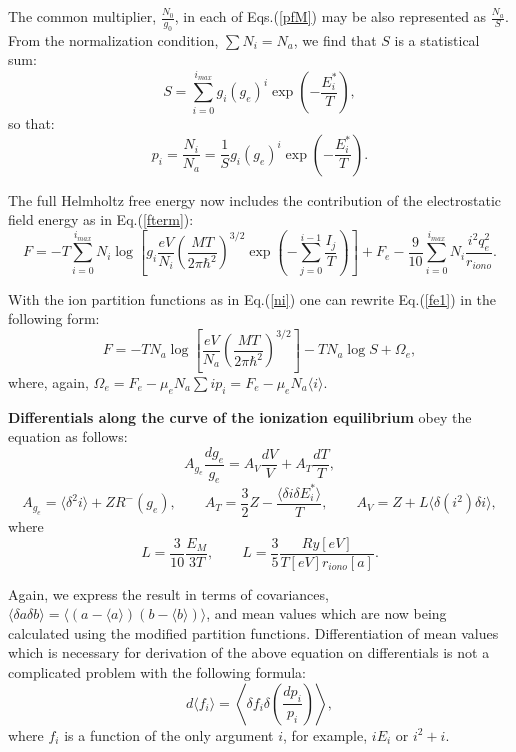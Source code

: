 The common multiplier, $\frac{N_0}{g_0}$, in each of Eqs.(\ref{pfM}) may be also represented as $\frac{N_a}{S}$.
From the normalization condition, $\sum N_i = N_a$, we find that $S$ is a statistical sum:
\begin{equation}
S=\sum_{i=0}^{i_{max}} g_i (g_e)^i \exp\left(-\frac{E_i^*}T\right),
\end{equation}
so that:
\begin{equation}\label{ni}
p_i = \frac{N_i}{N_a} = \frac{1}S g_i (g_e)^i \exp \left( -\frac{E_i^*}T \right).
\end{equation}

The full Helmholtz free energy now includes the contribution of the electrostatic field energy as in Eq.(\ref{fterm}):
\begin{equation}\label{fe1}
F=-T
\sum_{i=0}^{i_{max}}{
N_i\log\left[g_i
  \frac{eV}{N_i}\left(\frac{MT}{2\pi \hbar^2}\right)^{3/2}\exp \left(-\sum_{j=0}^{i-1}\frac{I_j}T \right)\right]}+F_e
  -\frac{9}{10} \sum_{i=0}^{i_{max}} N_i \frac{i^2 q_e^2}{r_{iono}}.
\end{equation}  

With the ion partition functions as in Eq.(\ref{ni}) one can rewrite Eq.(\ref{fe1}) in the following form:
\begin{equation}\label{ffullm}
F = -TN_a\log\left[\frac{eV}{N_a}\left(\frac{MT}{2\pi \hbar^2}\right)^{3/2}\right]-TN_a\log S + \Omega_e, 
\end{equation}
where, again, $\Omega_e = F_e - \mu_e N_a \sum i p_i = F_e - \mu_e N_a \langle i \rangle $.

{\bf Differentials along the curve of the ionization equilibrium} obey the equation as follows:
\begin{equation}\label{diffstruct}
A_{g_e} \frac{dg_e}{g_e} = A_V \frac{dV}{V} + A_T \frac{dT}{T},
\end{equation}
\begin{equation}
A_{g_e} = \langle \delta^2 i \rangle + ZR^-(g_e), \qquad
A_T     = \frac32 Z - \frac{\langle \delta i \delta E^*_i \rangle}{T}, \qquad
A_V     = Z + L \langle \delta(i^2) \delta i \rangle,
\end{equation}
where 
\begin{equation}
L   = \frac{3}{10} \frac{E_M}{3T}, \qquad
L = \frac35 \frac{Ry[eV]}{T[eV] r_{iono}[a]}.
\end{equation}


Again, we express the result in terms of covariances,
$\langle \delta a \delta b \rangle = \langle (a - \langle a \rangle) (b - \langle b \rangle) \rangle$,
and mean values which are now being calculated
using the modified partition functions.
Differentiation of mean values which is necessary for derivation of the above equation on
differentials is not a complicated problem with the following formula:
\begin{equation}
d \langle f_i \rangle = \left\langle \delta f_i \delta\left( \frac{dp_i}{p_i} \right) \right\rangle,
\end{equation}
where $f_i$ is a function of the only argument $i$, for example, $iE_i$ or $i^2+i$.

